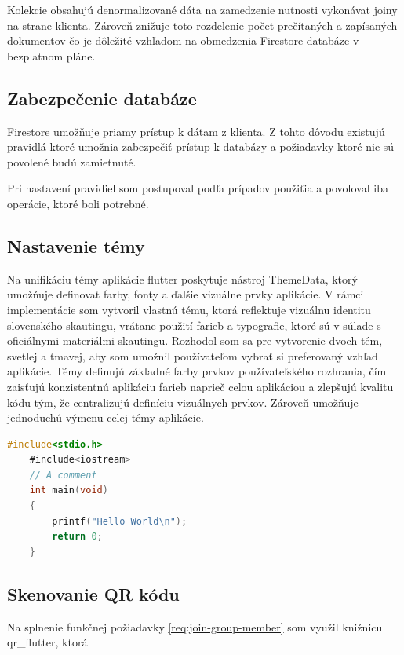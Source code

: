 Kolekcie obsahujú denormalizované dáta na zamedzenie nutnosti vykonávat joiny na strane klienta. Zároveň znižuje toto rozdelenie počet prečítaných a zapísaných dokumentov čo je dôležité vzhľadom na obmedzenia Firestore databáze v bezplatnom pláne.

\subsection{Zabezpečenie databáze}
Firestore umožňuje priamy prístup k dátam z klienta. Z tohto dôvodu existujú pravidlá ktoré umožnia zabezpečiť prístup k databázy a požiadavky ktoré nie sú povolené budú zamietnuté.

Pri nastavení pravidiel som postupoval podľa prípadov použiťia a povoloval iba operácie, ktoré boli potrebné.



\subsection{Nastavenie témy}
Na unifikáciu témy aplikácie flutter poskytuje nástroj ThemeData, ktorý umožňuje definovat farby, fonty a ďalšie vizuálne prvky aplikácie. V rámci implementácie som vytvoril vlastnú tému, ktorá reflektuje vizuálnu identitu slovenského skautingu, vrátane použití farieb a typografie, ktoré sú v súlade s oficiálnymi materiálmi skautingu. Rozhodol som sa pre vytvorenie dvoch tém, svetlej a tmavej, aby som umožnil používateľom vybrať si preferovaný vzhľad aplikácie. Témy definujú základné farby prvkov používateľského rozhrania, čím zaisťujú konzistentnú aplikáciu farieb naprieč celou aplikáciou a zlepšujú kvalitu kódu tým, že centralizujú definíciu vizuálnych prvkov. Zároveň umožňuje jednoduchú výmenu celej témy aplikácie.

\begin{lstlisting}[caption={Aplikovanie témy},label=list:8-6,captionpos=b,float,abovecaptionskip=-\medskipamount,abovecaptionskip=\medskipamount,language=C]
    #include<stdio.h>
    #include<iostream>
    // A comment
    int main(void)
    {
        printf("Hello World\n");
        return 0;
    }
\end{lstlisting}

\subsection{Skenovanie QR kódu}
Na splnenie funkčnej požiadavky \ref{req:join-group-member} som využil knižnicu qr\_flutter, ktorá 


